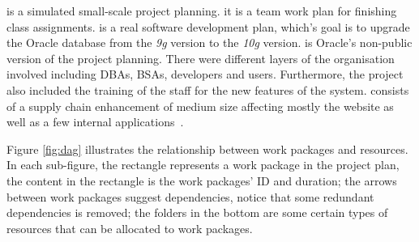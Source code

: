 \projectA{} is a simulated small-scale project planning. it is a team work plan
for finishing class assignments. \projectB{} is a real software development
plan, which's goal is to upgrade the Oracle database from the \emph{9g} version
to the \emph{10g} version. \projectB{} is Oracle's non-public version of the
project planning. There were different layers of the organisation involved
including DBAs, BSAs, developers and users.  Furthermore, the project also
included the training of the staff for the new features of the
system. \projectC{} consists of a supply chain enhancement of medium size
affecting mostly the website as well as a few internal applications~\cite{ren2}.

Figure \ref{fig:dag} illustrates the relationship between work packages and
resources. In each sub-figure, the rectangle represents a work package in the
project plan, the content in the rectangle is the work packages' ID and
duration; the arrows between work packages suggest dependencies, notice that
some redundant dependencies is removed; the folders in the bottom are some
certain types of resources that can be allocated to work packages. 

